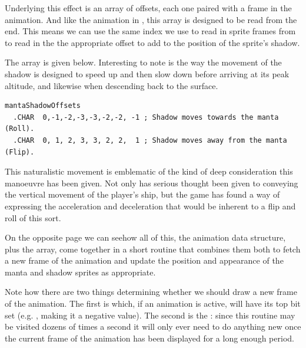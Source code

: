 Underlying this effect is an array of offsets, each one paired with a frame in the animation. And like the
animation in , this array is designed to be read from the end. This means
we can use the same index we use to read in sprite frames from  to read in the 
the appropriate offset to add to the position of the sprite's shadow.

The array is given below. Interesting to note is the way the movement of the shadow is designed to speed up and
then slow down before arriving at its peak altitude, and likewise when descending back to the surface.

\begin{lstlisting}
mantaShadowOffsets   
  .CHAR  0,-1,-2,-3,-3,-2,-2, -1 ; Shadow moves towards the manta (Roll).
  .CHAR  0, 1, 2, 3, 3, 2, 2,  1 ; Shadow moves away from the manta (Flip).
\end{lstlisting}

This naturalistic movement is emblematic of the kind of deep consideration this manoeuvre has been given. Not only
has serious thought been given to conveying the vertical movement of the player's ship, but the game has found a way
of expressing the acceleration and deceleration that would be inherent to a flip and roll of this sort.

On the opposite page we can seehow all of this, the  animation data structure, 
plus the  array, come together in a short routine that combines them both to fetch a
new frame of the animation and update the position and appearance of the  manta and shadow sprites as appropriate.

Note how there are two things determining whether we should draw a new frame of the animation. The first is
 which, if an animation is active, will have its top bit set (e.g. , making it 
a negative value). The second is the : since this routine may be visited dozens of times a
second it will only ever need to do anything new once the current frame of the animation has been displayed
for a long enough period.

